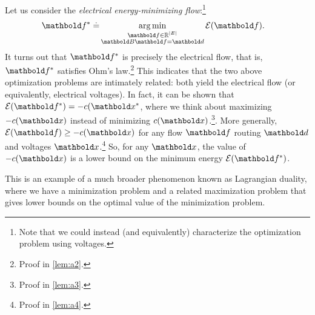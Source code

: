 Let us consider the \emph{electrical energy-minimizing flow}:\footnote{Note that we could instead (and equivalently) characterize the optimization problem using voltages.} \begin{align}
    \s{\vf} \defeq &\argmin_{\substack{\vf \in \R^{|\sE|} \\ \mB\vf = \vd}} \mathcal{E}(\vf). \label{eq:electrical_energy_minimizing_flow}
\end{align} It turns out that $\s{\vf}$ is precisely the electrical flow, that is, $\s{\vf}$ satisfies Ohm's law.\footnote{Proof in \cref{lem:a2}.} This indicates that the two above optimization problems are intimately related: both yield the electrical flow (or equivalently, electrical voltages). In fact, it can be shown that $\mathcal{E}(\s{\vf}) = -c(\s{\vx}$, where we think about maximizing $-c(\vx)$ instead of minimizing $c(\vx)$.\footnote{Proof in \cref{lem:a3}.}. More generally, $\mathcal{E}(\vf) \geq -c(\vx)$ for any flow $\vf$ routing $\vd$ and voltages $\vx$.\footnote{Proof in \cref{lem:a4}.} So, for any $\vx$, the value of $-c(\vx)$ is a lower bound on the minimum energy $\mathcal{E}(\s{\vf})$.

This is an example of a much broader phenomenon known as Lagrangian duality, where we have a minimization problem and a related maximization problem that gives lower bounds on the optimal value of the minimization problem.